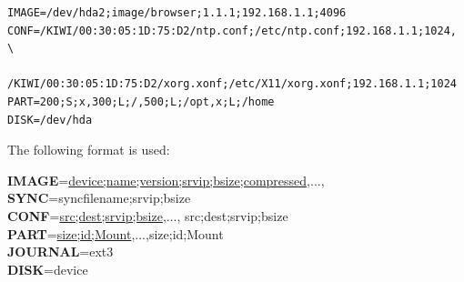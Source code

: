 \begin{verbatim}
IMAGE=/dev/hda2;image/browser;1.1.1;192.168.1.1;4096
CONF=/KIWI/00:30:05:1D:75:D2/ntp.conf;/etc/ntp.conf;192.168.1.1;1024,     \
     /KIWI/00:30:05:1D:75:D2/xorg.xonf;/etc/X11/xorg.xonf;192.168.1.1;1024
PART=200;S;x,300;L;/,500;L;/opt,x;L;/home
DISK=/dev/hda
\end{verbatim}

The following format is used:

\begin{Command}{14cm}
	\textbf{IMAGE}=\underline{device;name;version;srvip;bsize;compressed},...,\\
	\textbf{SYNC}=syncfilename;srvip;bsize\\
	\textbf{CONF}=\underline{src;dest;srvip;bsize},...,
                             src;dest;srvip;bsize\\
	\textbf{PART}=\underline{size;id;Mount},...,size;id;Mount\\
	\textbf{JOURNAL}=ext3\\
	\textbf{DISK}=device
\end{Command}


